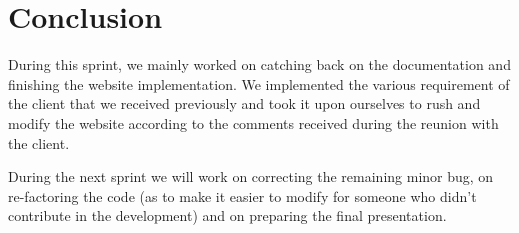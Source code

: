\section{Conclusion}

During this sprint, we mainly worked on catching back on the documentation and finishing the website implementation. We implemented the various requirement of the client that we received previously and took it upon ourselves to rush and modify the website according to the comments received during the reunion with the client. \newline

During the next sprint we will work on correcting the remaining minor bug, on re-factoring the code (as to make it easier to modify for someone who didn't contribute in the development) and on
preparing the final presentation.
